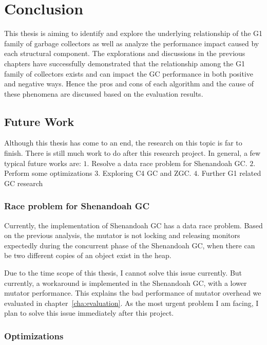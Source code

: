 \chapter{Conclusion}
\label{cha:conc}

This thesis is aiming to identify and explore the underlying relationship of the
G1 family of garbage collectors as well as analyze the performance impact caused by
each structural component.
The explorations and discussions in the previous chapters have successfully demonstrated
that the relationship among the G1 family of collectors exists and can impact the GC
performance in both positive and negative ways.
Hence the pros and cons of each algorithm and the cause of these phenomena
are discussed based on the evaluation results.

\section{Future Work}
\label{sec:future}

Although this thesis has come to an end, the research on this topic is far to finish.
There is still much work to do after this research project.
In general, a few typical future works are:
$1.$ Resolve a data race problem for Shenandoah GC.
$2.$ Perform some optimizations
$3.$ Exploring C4 GC and ZGC.
$4.$ Further G1 related GC research

\subsection{Race problem for Shenandoah GC}

Currently, the implementation of Shenandoah GC has a data race problem.
Based on the previous analysis, the mutator is not locking and releasing monitors
expectedly during the concurrent phase of the Shenandoah GC, when there can be
two different copies of an object exist in the heap.

Due to the time scope of this thesis, I cannot solve this issue currently.
But currently, a workaround is implemented in the Shenandoah GC, with a lower mutator performance.
This explains the bad performance of mutator overhead we evaluated in chapter~\ref{cha:evaluation}.
As the most urgent problem I am facing, I plan to solve this issue immediately after
this project.

\subsection{Optimizations}

